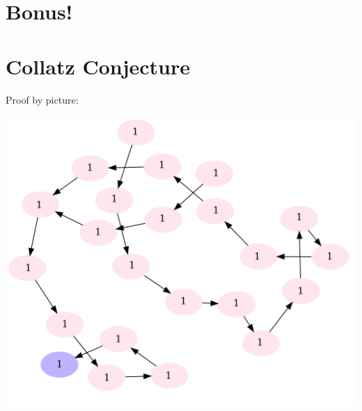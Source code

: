 \setcounter{section}{0}

\section{Bonus!}
\section*{Collatz Conjecture}
\vspace{-0.1cm}
Proof by picture:
\begin{center}
\includegraphics[width=\textwidth]{collatz.png}
\end{center}
